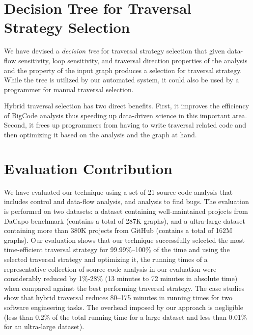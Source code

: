 \section{Decision Tree for Traversal Strategy Selection}
We have devised a {\em decision tree} for traversal strategy selection that 
given data-flow sensitivity, loop sensitivity, and traversal direction properties 
of the analysis and the \graphprop{} property of the input graph produces 
a selection for traversal strategy.
While the tree is utilized by our automated system, it could also be used by 
a programmer for manual traversal selection.

Hybrid traversal selection has two direct benefits. First, it improves the 
efficiency of BigCode analysis thus speeding up data-driven science in this important area.
Second, it frees up programmers from having to write traversal related code 
and then optimizing it based on the analysis and the graph at hand. 

\section{Evaluation Contribution}
We have evaluated our technique using a set of 21 source code analysis that
includes control and data-flow analysis, and analysis to find bugs. The
evaluation is performed on two datasets: a dataset containing well-maintained
projects from DaCapo benchmark (contains a total of 287K graphs), and a
ultra-large dataset containing more than 380K projects from GitHub (contains a
total of 162M graphs). Our evaluation shows that our technique successfully selected
the most time-efficient traversal strategy for 99.99\%--100\% of the time and
using the selected traversal strategy and optimizing it, the running times of a
representative collection of source code analysis in our evaluation
were considerably reduced by 1\%-28\% (13 minutes to 72 minutes in absolute time) when compared against the best performing traversal strategy. The case studies show that hybrid traversal reduces 80--175 minutes in running times for two software engineering tasks.
The overhead imposed by our approach is negligible (less than 0.2\% of the total 
running time for a large dataset and less than 0.01\% for an ultra-large dataset). 

